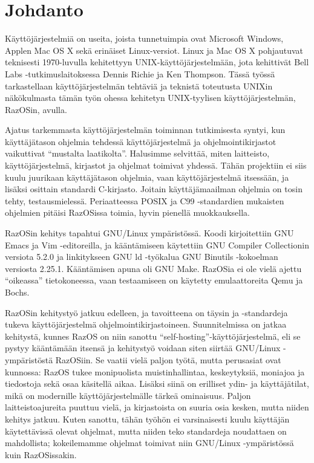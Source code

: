 \chapter{Johdanto}
\label{Johdanto}

Käyttöjärjestelmiä on useita, joista tunnetuimpia ovat Microsoft Windows, Applen Mac OS X sekä erinäiset Linux-versiot. Linux ja Mac OS X pohjautuvat teknisesti 1970-luvulla kehitettyyn UNIX-käyttöjärjestelmään, jota kehittivät Bell Labs -tutkimuslaitoksessa Dennis Richie ja Ken Thompson. Tässä työssä tarkastellaan käyttöjärjestelmän tehtäviä ja teknistä toteutusta UNIXin näkökulmasta tämän työn ohessa kehitetyn UNIX-tyylisen käyttöjärjestelmän, RazOSin, avulla.

\par

Ajatus tarkemmasta käyttöjärjestelmän toiminnan tutkimisesta syntyi, kun käyttäjätason ohjelmia tehdessä käyttöjärjestelmä ja ohjelmointikirjastot vaikuttivat ``mustalta laatikolta''. Halusimme selvittää, miten laitteisto, käyttöjärjestelmä, kirjastot ja ohjelmat toimivat yhdessä. Tähän projektiin ei siis kuulu juurikaan käyttäjätason ohjelmia, vaan käyttöjärjestelmä itsessään, ja lisäksi osittain standardi C-kirjasto. Joitain käyttäjämaailman ohjelmia on tosin tehty, testausmielessä. Periaatteessa POSIX ja C99 -standardien mukaisten ohjelmien pitäisi RazOSissa toimia, hyvin pienellä muokkauksella.

\par

RazOSin kehitys tapahtui GNU/Linux ympäristössä. Koodi kirjoitettiin GNU Emacs ja Vim -editoreilla, ja kääntämiseen käytettiin GNU Compiler Collectionin versiota 5.2.0 ja linkitykseen GNU ld -työkalua GNU Binutils -kokoelman versiosta 2.25.1. Kääntämisen apuna oli GNU Make. RazOSia ei ole vielä ajettu ``oikeassa'' tietokoneessa, vaan testaamiseen on käytetty emulaattoreita Qemu ja Bochs.

\par

RazOSin kehitystyö jatkuu edelleen, ja tavoitteena on täysin \parencite{POSIX} ja \parencite{ISOC99} -standardeja tukeva käyttöjärjestelmä ohjelmointikirjastoineen. Suunnitelmissa on jatkaa kehitystä, kunnes RazOS on niin sanottu ``self-hosting''-käyttöjärjestelmä, eli se pystyy kääntämään itsensä ja kehitystyö voidaan siten siirtää GNU/Linux -ympäristöstä RazOSiin. Se vaatii vielä paljon työtä, mutta perusasiat ovat kunnossa: RazOS tukee monipuolista muistinhallintaa, keskeytyksiä, moniajoa ja tiedostoja sekä osaa käsitellä aikaa. Lisäksi siinä on erilliset ydin- ja käyttäjätilat, mikä on modernille käyttöjärjestelmälle tärkeä ominaisuus. Paljon laitteistoajureita puuttuu vielä, ja kirjastoista on suuria osia kesken, mutta niiden kehitys jatkuu. Kuten sanottu, tähän työhön ei varsinaisesti kuulu käyttäjän käytettävissä olevat ohjelmat, mutta niiden teko standardeja noudattaen on mahdollista; kokeilemamme ohjelmat toimivat niin GNU/Linux -ympäristössä kuin RazOSissakin.

